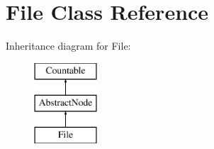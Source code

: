 \hypertarget{class_sebastian_bergmann_1_1_code_coverage_1_1_node_1_1_file}{}\section{File Class Reference}
\label{class_sebastian_bergmann_1_1_code_coverage_1_1_node_1_1_file}
Inheritance diagram for File\+:\begin{figure}[H]
\begin{center}
\leavevmode
\includegraphics[height=3.000000cm]{class_sebastian_bergmann_1_1_code_coverage_1_1_node_1_1_file}
\end{center}
\end{figure}
